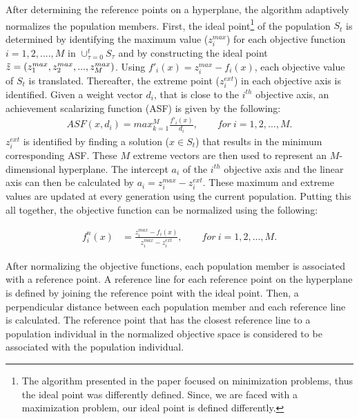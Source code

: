 After determining the reference points on a hyperplane, the algorithm adaptively normalizes the population members. First, the ideal point\footnote{The algorithm presented in the paper focused on minimization problems, thus the ideal point was differently defined. Since, we are faced with a maximization problem, our ideal point is defined differently.} of the population $S_t$ is determined by identifying the maximum value ($z_i^{max}$) for each objective function $i = 1, 2,...., M$ in $\cup_{\tau=0}^{t} S_\tau$ and by constructing the ideal point $\Tilde{z} = (z_1^{max}, z_2^{max},..., z_M^{max})$. Using $f'_i(x) = z_i^{max} - f_i(x)$, each objective value of $S_t$ is translated. Thereafter, the extreme point ($z_i^{ext}$) in each objective axis is identified. Given  a weight vector $d_i$, that is close to the $i^{th}$ objective axis, an achievement scalarizing function (ASF) is given by the following:
\begin{align*}
    ASF(x, d_i) = max_{k=1}^M \frac{f'_i(x)}{d_i}, \qquad for\ i = 1, 2,...,M. 
\end{align*}
$z_i^{ext}$ is identified by finding a solution ($x \in S_t$) that results in the minimum corresponding ASF. These $M$ extreme vectors are then used to represent an $M$-dimensional hyperplane. The intercept $a_i$ of the $i^{th}$ objective axis and the linear axis can then be calculated by $a_i = z_i^{max} - z_i^{ext}$. These maximum and extreme values are updated at every generation using the current population. Putting this all together, the objective function can be normalized using the following:

\begin{align}
    f_i^n(x) &=  \frac{z_i^{max} - f_i(x)}{z_i^{max} - z_i^{ext}}, \qquad for\ i = 1, 2,...,M. \label{eq:41a}  
\end{align}

After normalizing the objective functions, each population member is associated with a reference point. A reference line for each reference point on the hyperplane is defined by joining the reference point with the ideal point. Then, a perpendicular distance between each population member and each reference line is calculated. The reference point that has the closest reference line to a population individual in the normalized objective space is considered to be associated with the population individual.

